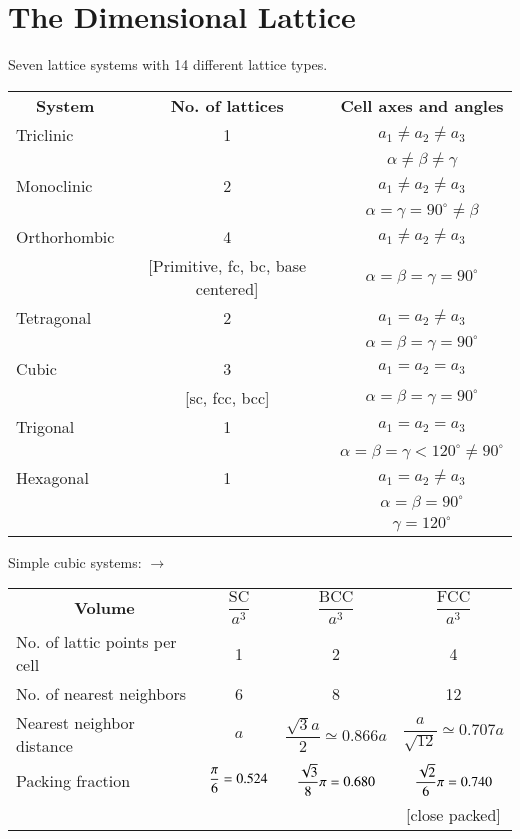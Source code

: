 \chapter{The Dimensional Lattice}\label{chap3}

Seven lattice systems with 14 different lattice types.
\begin{center}
\begin{tabular}{lcc}
\multicolumn{1}{c}{\bf System} & \multicolumn{1}{c}{\bf No. of lattices} & \multicolumn{1}{c}{\bf Cell axes and angles}\\[3pt]
Triclinic & 1 & $a_{1}\neq a_{2}\neq a_{3}$\\
          &   & $\alpha\neq \beta\neq \gamma$\\
Monoclinic & 2 & $a_{1}\neq a_{2}\neq a_{3}$\\
           &   & $\alpha=\gamma=90^{\circ}\neq \beta$\\
Orthorhombic & 4 & $a_{1}\neq a_{2}\neq a_{3}$\\
             & \multicolumn{1}{p{3cm}}{[Primitive, fc, bc, base centered]} & $\alpha=\beta=\gamma=90^{\circ}$\\
Tetragonal & 2 & $a_{1}=a_{2}\neq a_{3}$\\
           &   & $\alpha=\beta=\gamma=90^{\circ}$\\
Cubic & 3 & $a_{1}=a_{2}=a_{3}$\\
      & [sc, fcc, bcc] & $\alpha=\beta=\gamma=90^{\circ}$\\
Trigonal & 1 & $a_{1}=a_{2}=a_{3}$\\
         &   & $\alpha=\beta=\gamma < 120^{\circ}\neq 90^{\circ}$\\
Hexagonal & 1 & $a_{1}=a_{2}\neq a_{3}$\\
          &   & $\alpha=\beta=90^{\circ}$\\
          &   & $\gamma=120^{\circ}$
\end{tabular}
\end{center}

Simple cubic systems: $\to$
{\fontsize{9}{11}\selectfont
\begin{center}
\begin{tabular}{lccc}
\multicolumn{1}{c}{\bf Volume} & $\dfrac{\text{SC}}{a^{3}}$ & $\dfrac{\text{BCC}}{a^{3}}$ & $\dfrac{\text{FCC}}{a^{3}}$\\[7pt]
No. of lattic points per cell & 1 & 2 & 4\\[3pt]
No. of nearest neighbors & 6 & 8 & 12\\[5pt]
Nearest neighbor distance & $a$ & $\dfrac{\sqrt{3}a}{2}\simeq 0.866a$ & $\dfrac{a}{\sqrt{12}}\simeq 0.707a$\\[10pt]
Packing fraction & $\dfrac{\pi}{6}\newline =0.524$ & $\dfrac{\sqrt{3}}{8}\pi\newline =0.680$ & $\dfrac{\sqrt{2}}{6}\pi\newline =0.740$\\[7pt]
                 &                        & & [close packed]
\end{tabular}
\end{center}}\relax

